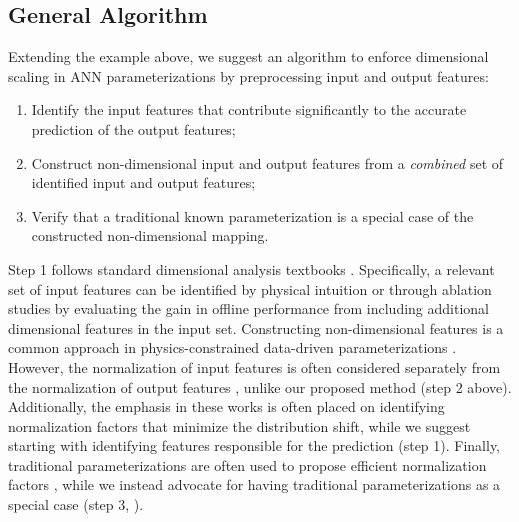 \documentclass[draft]{agujournal2019}
\begin{document}
\subsection{General Algorithm} \label{sec:general_algorithm}

Extending the example above, we suggest an algorithm to enforce dimensional scaling in  ANN parameterizations by preprocessing input and output features:
\begin{enumerate}
    \item Identify the input features that contribute significantly to the accurate prediction of the output features;
    \item Construct non-dimensional input and output features from a \textit{combined} set of identified input and output features;
    \item Verify that a traditional known parameterization is a special case of the constructed non-dimensional mapping. 
\end{enumerate}

Step 1 follows standard dimensional analysis textbooks \cite{bridgman1922dimensional, barenblatt1996scaling}.
Specifically, a relevant set of input features can be identified by physical intuition or through ablation studies by evaluating the gain in offline performance from including additional dimensional features in the input set. 
Constructing non-dimensional features is a common approach in physics-constrained data-driven parameterizations \cite{ling2016reynolds, schneider2024opinion}. However, the normalization of input features is often considered separately from the normalization of output features \cite{xie2020modeling, kang2023neural, beucler2024climate, christopoulos2024online}, unlike our proposed method (step 2 above). Additionally, the emphasis in these works is often placed on identifying normalization factors that minimize the distribution shift, while we suggest starting with identifying features responsible for the prediction (step 1). Finally, traditional parameterizations are often used to propose efficient normalization factors \cite{xie2020modeling, kang2023neural, connolly2025deep}, while we instead advocate for having traditional parameterizations as a special case (step 3, ).
%
%
\end{document}
